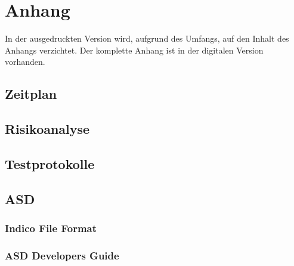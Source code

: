 \chapter{Anhang}
In der ausgedruckten Version wird, aufgrund des Umfangs, auf den Inhalt des Anhangs verzichtet. Der komplette Anhang ist in der digitalen Version vorhanden.

\section{Zeitplan}
\section{Risikoanalyse}
\section{Testprotokolle} \label{sec:testProtocolls}
\section{ASD} \label{sec:asd}
\subsection{Indico File Format}
\subsection{ASD Developers Guide} \label{subsection:developersGuide}
%
%
%
%
%